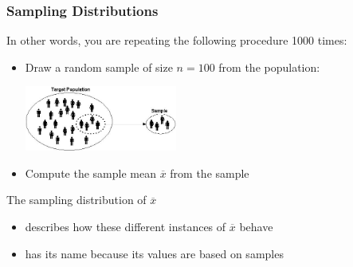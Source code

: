 \documentclass[handout]{beamer}
\newcommand{\blue}[1]{\textcolor{blue2}{#1}}
\newcommand{\xbar}{\overline{x}}
\begin{document}
\begin{frame}[fragile]
\frametitle{Sampling Distributions}
In other words, you are repeating the following procedure 1000 times:
\begin{itemize}
\pause \item Draw a random sample of size $n=100$ from the population:
\begin{center}
\includegraphics[width=5cm]{figure/target-population.jpg}
\end{center}
\pause \item Compute the sample mean $\xbar$ from the sample
\end{itemize}

\vskip 0.5cm

\pause The \blue{sampling distribution of $\xbar$} 
\begin{itemize}
\pause \item describes how these different instances of $\xbar$ behave
\pause \item has its name because its values are based on \blue{samples}
\end{itemize}

\end{frame}
\end{document}
